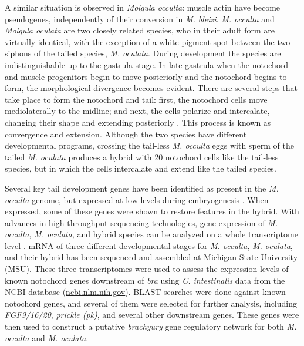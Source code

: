 A similar situation is observed in \textit{Molgula occulta}: muscle actin have become pseudogenes, independently of their conversion in \textit{M. bleizi}. \textit{M. occulta} and \textit{Molgula oculata} are two closely related species, who in their adult form are virtually identical, with the exception of a white pigment spot between the two siphons of the tailed species, \textit{M. oculata}. During development the species are indistinguishable up to the gastrula stage. In late gastrula when the notochord and muscle progenitors begin to move posteriorly \cite{swalla_novel_1993} and the notochord begins to form, the morphological divergence becomes evident. There are several steps that take place to form the notochord and tail: first, the notochord cells move mediolaterally to the midline; and next, the cells polarize and intercalate, changing their shape and extending posteriorly \cite{keller_mechanisms_2000, jiang_ascidian_2005,stemple_structure_2005}. This process is known as convergence and extension. Although the two species have different developmental programs, crossing the tail-less \textit{M. occulta} eggs with sperm of the tailed \textit{M. oculata} produces a hybrid with 20 notochord cells like the tail-less species, but in which the cells intercalate and extend like the tailed species.  

Several key tail development genes have been identified as present in the \textit{M. occulta} genome, but expressed at low levels during embryogenesis \cite{swalla_interspecific_1990,jeffery_factors_1992,swalla_novel_1993}. When expressed, some of these genes were shown to restore features in the hybrid. With advances in high throughput sequencing technologies, gene expression of \textit{M. occulta}, \textit{M. oculata}, and hybrid species can be analyzed on a whole transcriptome level \cite{gyoja_analysis_2007,pickrell_variation_2010}. mRNA of three different developmental stages for \textit{M. occulta}, \textit{M. oculata}, and their hybrid has been sequenced and assembled at Michigan State University (MSU). These three transcriptomes were used to%
assess the expression levels of known notochord genes downstream of \textit{bra} using \textit{C. intestinalis} data from the NCBI database (\url{ncbi.nlm.nih.gov}). BLAST searches were done against known notochord genes, and several of them were selected for further analysis, including \textit{FGF9/16/20}, \textit{prickle (pk)}, and several other downstream genes.  These genes were then used to construct a putative \textit{brachyury} gene regulatory network for both \textit{M. occulta} and \textit{M. oculata}. 


